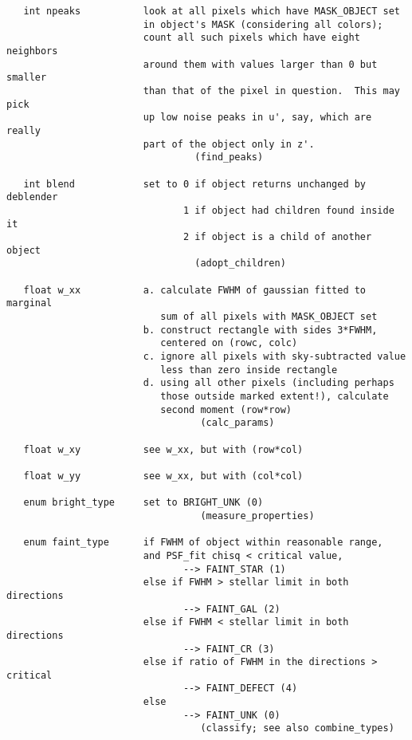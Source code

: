 \begin{verbatim}
   int npeaks           look at all pixels which have MASK_OBJECT set
                        in object's MASK (considering all colors);
                        count all such pixels which have eight neighbors
                        around them with values larger than 0 but smaller
                        than that of the pixel in question.  This may pick
                        up low noise peaks in u', say, which are really
                        part of the object only in z'.
                                 (find_peaks)

   int blend            set to 0 if object returns unchanged by deblender
                               1 if object had children found inside it
                               2 if object is a child of another object
                                 (adopt_children)

   float w_xx           a. calculate FWHM of gaussian fitted to marginal
                           sum of all pixels with MASK_OBJECT set 
                        b. construct rectangle with sides 3*FWHM, 
                           centered on (rowc, colc)
                        c. ignore all pixels with sky-subtracted value
                           less than zero inside rectangle
                        d. using all other pixels (including perhaps
                           those outside marked extent!), calculate
                           second moment (row*row)
                                  (calc_params)

   float w_xy           see w_xx, but with (row*col)

   float w_yy           see w_xx, but with (col*col)

   enum bright_type     set to BRIGHT_UNK (0)
                                  (measure_properties)

   enum faint_type      if FWHM of object within reasonable range,
                        and PSF_fit chisq < critical value, 
                               --> FAINT_STAR (1)
                        else if FWHM > stellar limit in both directions
                               --> FAINT_GAL (2)     
                        else if FWHM < stellar limit in both directions
                               --> FAINT_CR (3)
                        else if ratio of FWHM in the directions > critical
                               --> FAINT_DEFECT (4)
                        else
                               --> FAINT_UNK (0)
                                  (classify; see also combine_types)


\end{verbatim}
